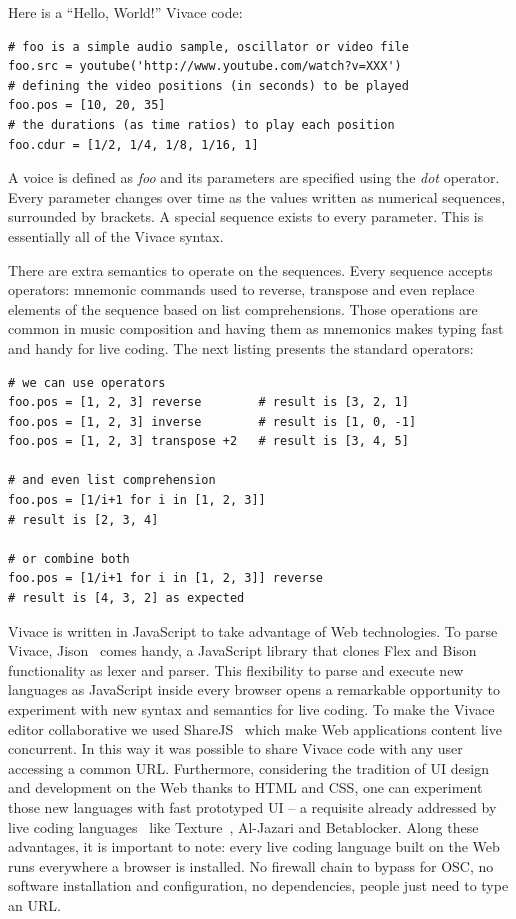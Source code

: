 \documentclass[letterpaper, 12pt]{article}
\begin{document}
Here is a ``Hello, World!'' Vivace code:

\begin{Verbatim}[fontfamily=courier, xleftmargin=\parindent]
# foo is a simple audio sample, oscillator or video file
foo.src = youtube('http://www.youtube.com/watch?v=XXX')
# defining the video positions (in seconds) to be played
foo.pos = [10, 20, 35]
# the durations (as time ratios) to play each position
foo.cdur = [1/2, 1/4, 1/8, 1/16, 1]
\end{Verbatim}

A voice is defined as \textit{foo} and its parameters are specified
using the \textit{dot} operator. Every parameter changes over time as
the values written as numerical sequences, surrounded by brackets. A
special sequence exists to every parameter. This is essentially all of
the Vivace syntax.

There are extra semantics to operate on the sequences. Every sequence
accepts operators: mnemonic commands used to reverse, transpose and
even replace elements of the sequence based on list
comprehensions. Those operations are common in music composition and
having them as mnemonics makes typing fast and handy for live
coding. The next listing presents the standard operators:

\begin{Verbatim}[fontfamily=courier, xleftmargin=\parindent]
# we can use operators
foo.pos = [1, 2, 3] reverse        # result is [3, 2, 1]
foo.pos = [1, 2, 3] inverse        # result is [1, 0, -1]
foo.pos = [1, 2, 3] transpose +2   # result is [3, 4, 5]

# and even list comprehension
foo.pos = [1/i+1 for i in [1, 2, 3]] 
# result is [2, 3, 4]

# or combine both
foo.pos = [1/i+1 for i in [1, 2, 3]] reverse 
# result is [4, 3, 2] as expected
\end{Verbatim}

Vivace is written in JavaScript to take advantage of Web technologies.
To parse Vivace, Jison~\citep{jison} comes handy, a JavaScript
library that clones Flex and Bison functionality as lexer and
parser. This flexibility to parse and execute new languages as
JavaScript inside every browser opens a remarkable opportunity to
experiment with new syntax and semantics for live coding. To make the
Vivace editor collaborative we used ShareJS~\citep{sharejs} which make
Web applications content live concurrent. In this way it was possible
to share Vivace code with any user accessing a common
URL. Furthermore, considering the tradition of UI design and
development on the Web thanks to HTML and CSS, one can experiment
those new languages with fast prototyped UI -- a requisite already
addressed by live coding languages~\citep{mclean2010visualisation,
  magnusson2011algorithms} like Texture~\citep{mclean2011texture},
Al-Jazari and Betablocker. Along these advantages, it is important to
note: every live coding language built on the Web runs everywhere a
browser is installed. No firewall chain to bypass for OSC, no software
installation and configuration, no dependencies, people just need to
type an URL.
\end{document}
